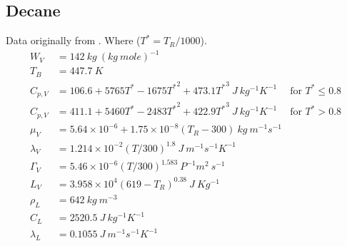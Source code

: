 \documentclass[../Interim_Report_Master]{subfiles}
\begin{document}
\subsection{Decane}
Data originally from \cite{abramzon1989}. Where ($T^*=T_R/1000$).
\begin{subequations}
	\begin{align}
	W_V &= 142~kg~(kg~mole)^{-1} \\
	T_B &= 447.7~K \\
	C_{p,V} &= 106.6 + 5765T^* - 1675{T^*}^2 + 473.1{T^*}^3~J~kg^{-1}K^{-1} &\text{for $T^*\leq0.8$} \\
	C_{p,V} &= 411.1 + 5460T^* - 2483{T^*}^2 + 422.9{T^*}^3~J~kg^{-1}K^{-1} &\text{for $T^*>0.8$} \\
	\mu_V &= 5.64\times 10^{-6} + 1.75\times 10^{-8}(T_R-300)~kg~m^{-1}s^{-1} \\
	\lambda_V &= 1.214 \times 10^{-2}(T/300)^{1.8}~J~m^{-1}s^{-1}K^{-1} \\
	\Gamma_V &= 5.46 \times 10^{-6}(T/300)^{1.583}~P^{-1}m^2~s^{-1} \\
	L_V &= 3.958\times 10^{4}(619-T_R)^{0.38}~J~Kg^{-1} \\
	\rho_L &= 642~kg~m^{-3} \\
	C_L &= 2520.5~J~kg^{-1}K^{-1} \\
	\lambda_L &= 0.1055~J~m^{-1}s^{-1}K^{-1}
	\end{align}
\end{subequations}
\end{document}

